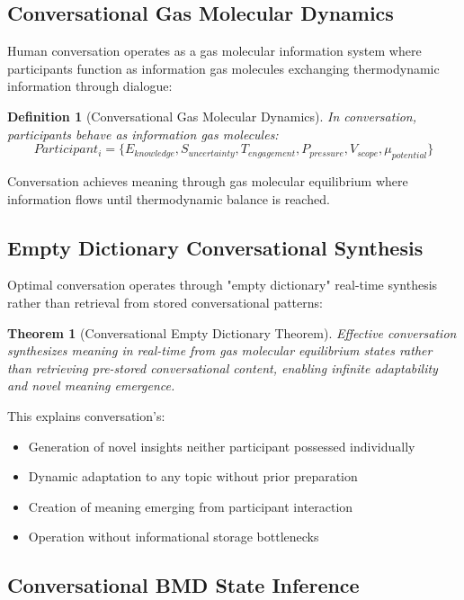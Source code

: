 \documentclass[12pt,a4paper]{article}
\newtheorem{theorem}{Theorem}
\newtheorem{definition}{Definition}
\begin{document}
\subsection{Conversational Gas Molecular Dynamics}

Human conversation operates as a gas molecular information system where participants function as information gas molecules exchanging thermodynamic information through dialogue:

\begin{definition}[Conversational Gas Molecular Dynamics]
In conversation, participants behave as information gas molecules:
$$Participant_i = \{E_{knowledge}, S_{uncertainty}, T_{engagement}, P_{pressure}, V_{scope}, \mu_{potential}\}$$
\end{definition}

Conversation achieves meaning through gas molecular equilibrium where information flows until thermodynamic balance is reached.

\subsection{Empty Dictionary Conversational Synthesis}

Optimal conversation operates through "empty dictionary" real-time synthesis rather than retrieval from stored conversational patterns:

\begin{theorem}[Conversational Empty Dictionary Theorem]
Effective conversation synthesizes meaning in real-time from gas molecular equilibrium states rather than retrieving pre-stored conversational content, enabling infinite adaptability and novel meaning emergence.
\end{theorem}

This explains conversation's:
\begin{itemize}
\item Generation of novel insights neither participant possessed individually
\item Dynamic adaptation to any topic without prior preparation
\item Creation of meaning emerging from participant interaction
\item Operation without informational storage bottlenecks
\end{itemize}

\subsection{Conversational BMD State Inference}
\end{document}
